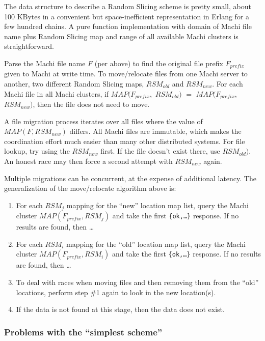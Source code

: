 \documentclass[preprint,10pt]{sigplanconf}
\begin{document}
The data structure to describe a Random Slicing scheme is pretty
small, about 100 KBytes in a convenient but space-inefficient
representation in Erlang for a few hundred chains.
A pure function implementation with domain of Machi file
name plus Random Slicing map and range of all available Machi clusters
is straightforward.

Parse the Machi file name $F$ (per above) to find the original
file prefix $F_{prefix}$ given to Machi at write time.
To move/relocate files from one Machi server to another, two different
Random Slicing maps, $RSM_{old}$ and $RSM_{new}$.  For each Machi file
in all Machi clusters, if
$MAP(F_{prefix},$ $RSM_{old})$ $=$ $MAP(F_{prefix},$ $RSM_{new})$,
then the file does not need to move.

A file migration process iterates over all files where the value of
$MAP(F, RSM_{new})$ differs.  All Machi files are immutable, which
makes the coordination effort much easier than many other distributed
systems.  For file lookup, try using the $RSM_{new}$ first.  If the
file doesn't exist there, use $RSM_{old})$.  An honest race may
then force a second attempt with $RSM_{new}$ again.

Multiple migrations can be concurrent, at the expense of additional
latency.  The generalization of the move/relocate algorithm above is:

\begin{enumerate}
\item For each $RSM_j$ mapping for the ``new'' location map list,
  query the Machi cluster $MAP(F_{prefix}, RSM_j)$ and take the
  first {\tt \{ok,\ldots\}} response.  If no results are found, then \ldots
\item For each $RSM_i$ mapping for the ``old'' location map list,
  query the Machi cluster $MAP(F_{prefix}, RSM_i)$ and take the
  first {\tt \{ok,\ldots\}} response.  If no results are found, then \ldots
\item To deal with races when moving files and then removing them from
  the ``old'' locations, perform step \#1 again to look in the new
  location(s).
\item If the data is not found at this stage, then the data does not exist.
\end{enumerate}

\subsubsection{Problems with the ``simplest scheme''}
\end{document}
